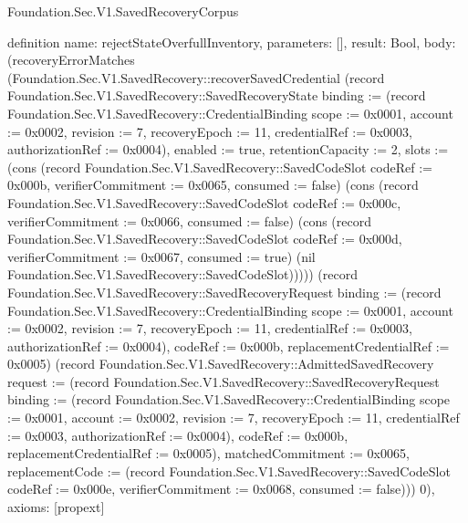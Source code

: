 \begin{lexlean}{Foundation.Sec.V1.SavedRecoveryCorpus}
\begin{semanticmodule}
definition{
  name: rejectStateOverfullInventory,
  parameters: [],
  result: Bool,
  body: (recoveryErrorMatches (Foundation.Sec.V1.SavedRecovery::recoverSavedCredential (record Foundation.Sec.V1.SavedRecovery::SavedRecoveryState {binding := (record Foundation.Sec.V1.SavedRecovery::CredentialBinding {scope := 0x0001, account := 0x0002, revision := 7, recoveryEpoch := 11, credentialRef := 0x0003, authorizationRef := 0x0004}), enabled := true, retentionCapacity := 2, slots := (cons (record Foundation.Sec.V1.SavedRecovery::SavedCodeSlot {codeRef := 0x000b, verifierCommitment := 0x0065, consumed := false}) (cons (record Foundation.Sec.V1.SavedRecovery::SavedCodeSlot {codeRef := 0x000c, verifierCommitment := 0x0066, consumed := false}) (cons (record Foundation.Sec.V1.SavedRecovery::SavedCodeSlot {codeRef := 0x000d, verifierCommitment := 0x0067, consumed := true}) (nil Foundation.Sec.V1.SavedRecovery::SavedCodeSlot))))}) (record Foundation.Sec.V1.SavedRecovery::SavedRecoveryRequest {binding := (record Foundation.Sec.V1.SavedRecovery::CredentialBinding {scope := 0x0001, account := 0x0002, revision := 7, recoveryEpoch := 11, credentialRef := 0x0003, authorizationRef := 0x0004}), codeRef := 0x000b, replacementCredentialRef := 0x0005}) (record Foundation.Sec.V1.SavedRecovery::AdmittedSavedRecovery {request := (record Foundation.Sec.V1.SavedRecovery::SavedRecoveryRequest {binding := (record Foundation.Sec.V1.SavedRecovery::CredentialBinding {scope := 0x0001, account := 0x0002, revision := 7, recoveryEpoch := 11, credentialRef := 0x0003, authorizationRef := 0x0004}), codeRef := 0x000b, replacementCredentialRef := 0x0005}), matchedCommitment := 0x0065, replacementCode := (record Foundation.Sec.V1.SavedRecovery::SavedCodeSlot {codeRef := 0x000e, verifierCommitment := 0x0068, consumed := false})})) 0),
  axioms: [propext]
}


\end{semanticmodule}
\end{lexlean}
